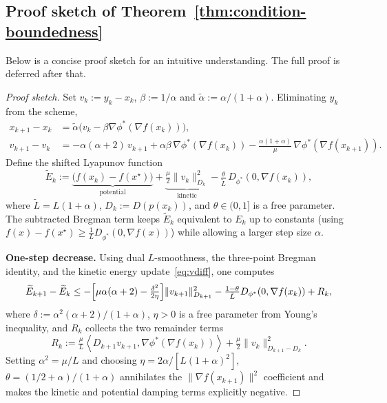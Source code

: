 \documentclass{article}
\theoremstyle{plain}
\theoremstyle{remark}
\newcommand{\dual}[1]{\left\langle {#1} \right\rangle}
\begin{document}
\subsection{Proof sketch of Theorem~\ref{thm:condition-boundedness}}
Below is a concise proof sketch for an intuitive understanding. The full proof is deferred after that.
\begin{proof}[Proof sketch]
Set $v_k := y_k - x_k$, $\beta:=1/\alpha$ and $\tilde\alpha := \alpha/(1+\alpha)$.
Eliminating $y_k$ from the scheme,
\begin{align}
  x_{k+1} - x_k &= \tilde\alpha\bigl(v_k - \beta\nabla\phi^*(\nabla f(x_k))\bigr),
  \label{eq:xdiff}\\
  v_{k+1} - v_k &= -\alpha(\alpha+2)\,v_{k+1}
    + \alpha\beta\,\nabla\phi^*(\nabla f(x_k))
    - \tfrac{\alpha(1+\alpha)}{\mu}\,\nabla\phi^*(\nabla f(x_{k+1})).
  \label{eq:vdiff}
\end{align}
Define the shifted Lyapunov function
\[
  \widetilde{E}_k
  := \underbrace{\bigl(f(x_k)-f(x^\star)\bigr)}_{\text{potential}}
   + \underbrace{\tfrac{\mu}{2}\|v_k\|_{D_k}^2}_{\text{kinetic}}
   - \tfrac{\theta}{\tilde{L}}\,D_{\phi^*}(0,\nabla f(x_k)),
\]
where $\tilde{L}=L(1+\alpha)$, $D_k := D(p(x_k))$, and $\theta\in(0,1]$ is a free parameter.
The subtracted Bregman term keeps $\widetilde{E}_k$ equivalent to $E_k$ up to constants
(using $f(x)-f(x^\star) \ge \frac{1}{L}D_{\phi^*}(0,\nabla f(x))$) while allowing a larger
step size $\alpha$.

\textbf{One-step decrease.}
Using dual $L$-smoothness, the three-point Bregman identity, and the kinetic energy
update~\eqref{eq:vdiff}, one computes
\[
  \widetilde{E}_{k+1} - \widetilde{E}_k
  \le
  -\Bigl[\mu\alpha(\alpha+2) - \tfrac{\delta^2}{2\eta}\Bigr]\|v_{k+1}\|_{D_{k+1}}^2
  - \tfrac{1-\theta}{\tilde{L}}D_{\phi^*}(0,\nabla f(x_k))
  + R_k,
\]
where $\delta := \alpha^2(\alpha+2)/(1+\alpha)$, $\eta>0$ is a free parameter from Young's
inequality, and $R_k$ collects the two remainder terms
\[
  R_k :=
  \tfrac{\mu}{L}\dual{D_{k+1}v_{k+1},\nabla\phi^*(\nabla f(x_k))}
  + \tfrac{\mu}{2}\|v_k\|_{D_{k+1}-D_k}^2.
\]
Setting $\alpha^2 = \mu/L$ and choosing $\eta = 2\alpha/[L(1+\alpha)^2]$,
$\theta = (1/2+\alpha)/(1+\alpha)$ annihilates the $\|\nabla f(x_{k+1})\|^2$
coefficient and makes the kinetic and potential damping terms explicitly negative.


\end{proof}
\end{document}
